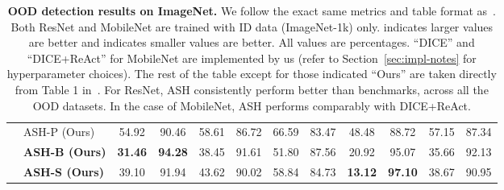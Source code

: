 \documentclass{article}
\newcommand{\secref}[1]{Section~\ref{sec:#1}}
\newcommand{\tablabel}[1]{\label{tab:#1}}
\begin{document}
\begin{table}[hbt!]
{\begin{tabular}{c c c c c c c c c c c c}
\rowcolor{lightgray} & \multicolumn{1}{l}{ASH-P (Ours)} & 54.92 & 90.46 & 58.61 & 86.72 & 66.59 & 83.47 & 48.48 & 88.72 & 57.15 & 87.34 \\
\rowcolor{lightgray} & \multicolumn{1}{l}{\textbf{ASH-B (Ours)}} & \textbf{31.46} & \textbf{94.28} & 38.45 & 91.61 & 51.80 & 87.56 & 20.92 & 95.07 & 35.66 & 92.13\\
\rowcolor{lightgray} & \multicolumn{1}{l}{\textbf{ASH-S (Ours)}} & 39.10 & 91.94 & 43.62 & 90.02 & 58.84 & 84.73 & \textbf{13.12} & \textbf{97.10} & 38.67 & 90.95 \\
\bottomrule

\end{tabular}}
\caption{\textbf{OOD detection results on ImageNet.} We follow the exact same metrics and table format as~\citet{react}. Both ResNet and MobileNet are trained with ID data (ImageNet-1k) only.  indicates larger values are better and  indicates smaller values are better. All values are percentages. ``DICE'' and ``DICE+ReAct'' for MobileNet are implemented by us (refer to \secref{impl-notes} for hyperparameter choices). The rest of the table except for those indicated ``Ours'' are taken directly from Table 1 in~\citet{react}. For ResNet, ASH consistently perform better than benchmarks, across all the OOD datasets. In the case of MobileNet, ASH performs comparably with DICE+ReAct.}
\tablabel{imagenet}

\end{table}
\end{document}
